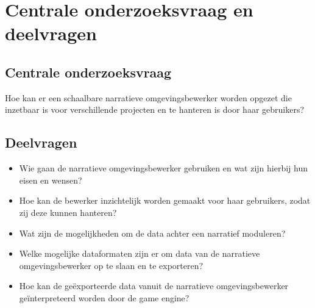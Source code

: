 \documentclass{report}
\begin{document}
\section{Centrale onderzoeksvraag en deelvragen}
\subsection{Centrale onderzoeksvraag}
Hoe kan er een schaalbare narratieve omgevingsbewerker worden opgezet die inzetbaar is voor verschillende projecten en te hanteren is door haar gebruikers?

\subsection{Deelvragen}
\begin{itemize}
\item Wie gaan de narratieve omgevingsbewerker gebruiken en wat zijn hierbij hun eisen en wensen?
\item Hoe kan de bewerker inzichtelijk worden gemaakt voor haar gebruikers, zodat zij deze kunnen hanteren?
\item Wat zijn de mogelijkheden om de data achter een narratief moduleren?
\item Welke mogelijke dataformaten zijn er om data van de narratieve omgevingsbewerker op te slaan en te exporteren?
\item Hoe kan de ge{\"e}xporteerde data vanuit de narratieve omgevingsbewerker ge{\"i}nterpreteerd worden door de game engine?
\end{itemize}
\end{document}
